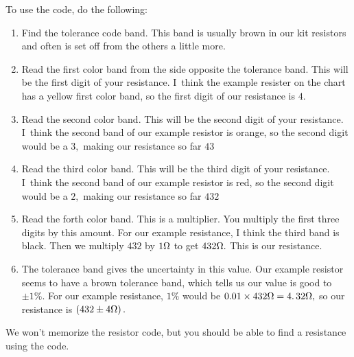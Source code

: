 To use the code, do the following:
\begin{enumerate}
\item Find the tolerance code band. This band is usually brown in our kit
resistors and often is set off from the others a little more.
\item Read the first color band from the side opposite the tolerance band.
This will be the first digit of your resistance. I\ think the example
resister on the chart has a yellow first color band, so the first digit of
our resistance is $4.$
\item Read the second color band. This will be the second digit of your
resistance. I\ think the second band of our example resistor is orange, so
the second digit would be a $3,$ making our resistance so far $43$
\item Read the third color band. This will be the third digit of your
resistance. I\ think the second band of our example resistor is red, so the
second digit would be a $2,$ making our resistance so far $432$
\item Read the forth color band. This is a multiplier. You multiply the
first three digits by this amount. For our example resistance, I think the
third band is black. Then we multiply $432$ by $1\unit{%
\Omega%
}$ to get $432\unit{%
\Omega%
}.$ This is our resistance.
\item The tolerance band gives the uncertainty in this value. Our example
resistor seems to have a brown tolerance band, which tells us our value is
good to $\pm 1\%.$ For our example resistance, $1\%$ would be $0.01\times 432%
\unit{%
\Omega%
}=\allowbreak 4.\,\allowbreak 32\unit{%
\Omega%
},$ so our resistance is $\left( 432\pm 4\unit{%
\Omega%
}\right) .$
\end{enumerate}

We won't memorize the resistor code, but you should be able to find a
resistance using the code.

